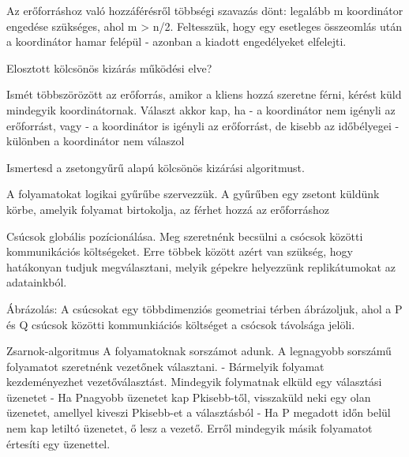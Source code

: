 \documentclass[twoside, a4paper, 12pt]{article}
\begin{document}
\begin{description}
                                        Az erőforráshoz való hozzáférésről többségi szavazás dönt: legalább m koordinátor engedése szükséges, ahol m > n/2.
                                        Feltesszük, hogy egy esetleges összeomlás után a koordinátor hamar felépül - azonban a kiadott engedélyeket elfelejti.
                                    \item  Elosztott kölcsönös kizárás működési elve?
                                    \item Ismét többszörözött az erőforrás, amikor a kliens hozzá szeretne férni, kérést küld mindegyik koordinátornak. Választ akkor kap, ha
                                        - a koordinátor nem igényli az erőforrást, vagy
                                        - a koordinátor is igényli az erőforrást, de kisebb az időbélyegei
                                        - különben a koordinátor nem válaszol
                                    \item  Ismertesd a zsetongyűrű alapú kölcsönös kizárási algoritmust.
                                    \item A folyamatokat logikai gyűrűbe szervezzük. A gyűrűben egy zsetont küldünk körbe, amelyik folyamat birtokolja,
                                        az férhet hozzá az erőforráshoz
                                    \item  Csúcsok globális pozícionálása. Meg szeretnénk becsülni a csócsok közötti kommunikációs költségeket. Erre többek között azért van szükség, hogy hatákonyan
                                        tudjuk megválasztani, melyik gépekre helyezzünk replikátumokat az adatainkból.
                                    \item Ábrázolás: A csúcsokat egy többdimenziós geometriai térben ábrázoljuk, ahol a P és Q csúcsok közötti kommunkiációs költséget a csócsok távolsága jelöli.
                                    \item  Zsarnok-algoritmus
                                        A folyamatoknak sorszámot adunk. A legnagyobb sorszámű folyamatot szeretnénk vezetőnek választani.
                                        - Bármelyik folyamat kezdeményezhet vezetőválasztást. Mindegyik folymatnak elküld egy választási üzenetet
                                        - Ha Pnagyobb üzenetet kap Pkisebb-től, visszaküld neki egy olan üzenetet, amellyel kiveszi Pkisebb-et a választásból
                                        - Ha P megadott időn belül nem kap letiltó üzenetet, ő lesz a vezető. Erről mindegyik másik folyamatot értesíti egy üzenettel.

\end{description}
\end{document}

